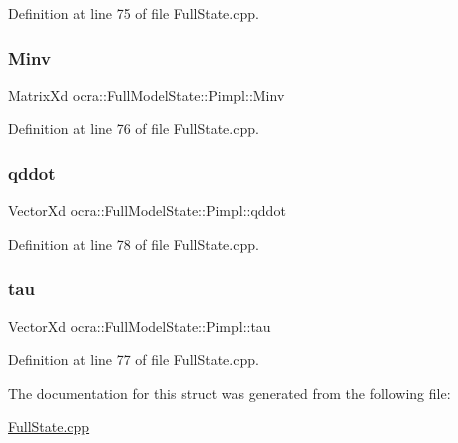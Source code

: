 Definition at line 75 of file Full\+State.\+cpp.

\hypertarget{structocra_1_1FullModelState_1_1Pimpl_a66abf4494ddc5e7de0fbdeee4d6404d0}{}\label{structocra_1_1FullModelState_1_1Pimpl_a66abf4494ddc5e7de0fbdeee4d6404d0} 
\subsubsection{\texorpdfstring{Minv}{Minv}}
{\footnotesize\ttfamily Matrix\+Xd ocra\+::\+Full\+Model\+State\+::\+Pimpl\+::\+Minv}



Definition at line 76 of file Full\+State.\+cpp.

\hypertarget{structocra_1_1FullModelState_1_1Pimpl_a9575456409af57d39f990f2dda27c23f}{}\label{structocra_1_1FullModelState_1_1Pimpl_a9575456409af57d39f990f2dda27c23f} 
\subsubsection{\texorpdfstring{qddot}{qddot}}
{\footnotesize\ttfamily Vector\+Xd ocra\+::\+Full\+Model\+State\+::\+Pimpl\+::qddot}



Definition at line 78 of file Full\+State.\+cpp.

\hypertarget{structocra_1_1FullModelState_1_1Pimpl_a451de435a3d80fdc760ab0d37cbad664}{}\label{structocra_1_1FullModelState_1_1Pimpl_a451de435a3d80fdc760ab0d37cbad664} 
\subsubsection{\texorpdfstring{tau}{tau}}
{\footnotesize\ttfamily Vector\+Xd ocra\+::\+Full\+Model\+State\+::\+Pimpl\+::tau}



Definition at line 77 of file Full\+State.\+cpp.



The documentation for this struct was generated from the following file\+:\begin{DoxyCompactItemize}
\item 
\hyperlink{FullState_8cpp}{Full\+State.\+cpp}\end{DoxyCompactItemize}
